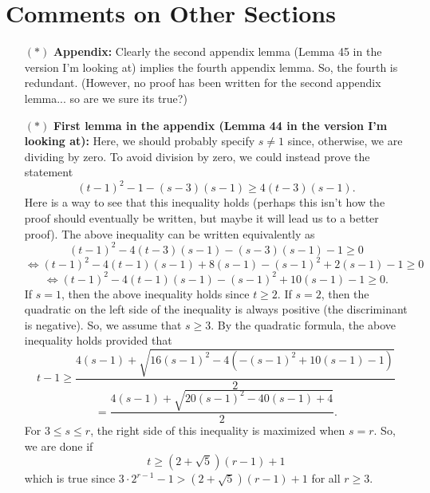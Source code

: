 \documentclass[11 pt]{article}
\theoremstyle{definition}
\theoremstyle{case}
\numberwithin{equation}{section}
\begin{document}
\section{Comments on Other Sections}

\begin{itemize}
\item[$\boldsymbol{(*)}$] \textbf{Appendix:} Clearly the second appendix lemma (Lemma 45 in the version I'm looking at) implies the fourth appendix lemma. So, the fourth is redundant. (However, no proof has been written for the second appendix lemma... so are we sure its true?) 
\item[$\boldsymbol{(*)}$]  \textbf{First lemma in the appendix (Lemma 44 in the version I'm looking at):}  Here, we should probably specify $s\neq 1$ since, otherwise, we are dividing by zero. To avoid division by zero, we could instead prove the statement 
\[(t-1)^2 - 1 - (s-3)(s-1) \geq 4(t-3)(s-1).\]
Here is a way to see that this inequality holds (perhaps this isn't how the proof should eventually be written, but maybe it will lead us to a better proof). The above inequality can be written equivalently as
\[(t-1)^2 - 4(t-3)(s-1) - (s-3)(s-1) - 1 \geq0\]
\[\Leftrightarrow (t-1)^2 - 4(t-1)(s-1) + 8(s-1) - (s-1)^2 + 2(s-1)- 1 \geq0\]
\[\Leftrightarrow (t-1)^2 - 4(t-1)(s-1) - (s-1)^2 + 10(s-1)- 1 \geq0.\]
If $s=1$, then the above inequality holds since $t\geq2$. If $s=2$, then the quadratic on the left side of the inequality is always positive (the discriminant is negative). So, we assume that $s\geq3$. By the quadratic formula, the above inequality holds provided that
\[t-1\geq \frac{4(s-1) + \sqrt{16(s-1)^2 - 4(-(s-1)^2 + 10(s-1)-1)}}{2}\]
\[=\frac{4(s-1) + \sqrt{20(s-1)^2 - 40(s-1) + 4}}{2}.\]
For $3\leq s\leq r$, the right side of this inequality is maximized when $s=r$. So, we are done if
\[t\geq \left(2+\sqrt{5}\right)(r-1) + 1\]
which is true since $3\cdot 2^{r-1} - 1 > \left(2+\sqrt{5}\right)(r-1) + 1$ for all $r\geq3$.  
\end{itemize}
\end{document}
